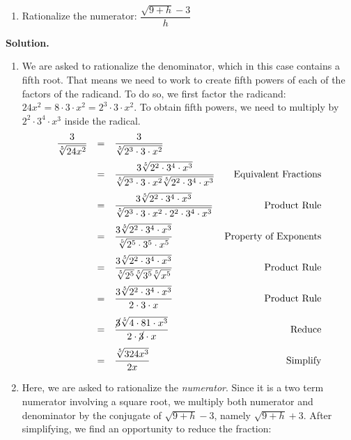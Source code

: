 \documentclass{ximera}
\begin{document}
{{{{\begin{example}
\begin{multicols}{2}
\begin{enumerate}
\item  Rationalize the numerator: $\dfrac{\sqrt{9 + h} - 3}{h}$

\setcounter{HW}{\value{enumi}}

\end{enumerate}
\end{multicols}

{\bf Solution.}

\begin{enumerate}

\item We are asked to rationalize the denominator, which in this case contains a fifth root.  That means we need to work to create fifth powers of each of the factors of the radicand.  To do so, we first factor the radicand:  $24x^2 = 8 \cdot 3 \cdot x^2 = 2^3 \cdot 3 \cdot x^2$.  To obtain fifth powers, we need to multiply by $2^2 \cdot 3^4 \cdot x^3$ inside the radical.  \[ \begin{array}{rclr}

\dfrac{3}{\sqrt[5]{24x^2}} & = & \dfrac{3}{\sqrt[5]{2^3 \cdot 3 \cdot x^2}} & \\ [12pt]
                           & = & \dfrac{3 \sqrt[5]{2^2 \cdot 3^4 \cdot x^3}}{\sqrt[5]{2^3 \cdot 3 \cdot x^2}\sqrt[5]{2^2 \cdot 3^4 \cdot x^3}} & \text{Equivalent Fractions} \\[12pt]
												& = & \dfrac{3 \sqrt[5]{2^2 \cdot 3^4 \cdot x^3}}{\sqrt[5]{2^3 \cdot 3 \cdot x^2 \cdot 2^2 \cdot 3^4 \cdot x^3}} & \text{Product Rule} \\[12pt]
													& = & \dfrac{3 \sqrt[5]{2^2 \cdot 3^4 \cdot x^3}}{\sqrt[5]{2^5 \cdot 3^5 \cdot x^5}} & \text{Property of Exponents}\\[12pt]
													
													& = & \dfrac{3 \sqrt[5]{2^2 \cdot 3^4 \cdot x^3}}{\sqrt[5]{2^5} \sqrt[5]{3^5}\sqrt[5]{x^5}} & \text{Product Rule}\\[12pt]
                          & = & \dfrac{3 \sqrt[5]{2^2 \cdot 3^4\cdot x^3}}{2 \cdot 3 \cdot x} & \text{Product Rule}\\[12pt]
													& = & \dfrac{\cancel{3} \sqrt[5]{4 \cdot 81\cdot x^3}}{2 \cdot \cancel{3} \cdot x} & \text{Reduce}\\[12pt]
													& = & \dfrac{\sqrt[5]{324x^3}}{2x} & \text{Simplify}\\
													\end{array}\]
													
\item  Here, we are asked to rationalize the \textit{numerator}.  Since it is a two term numerator involving a square root, we multiply both numerator and denominator by the conjugate of $\sqrt{9 + h} - 3$, namely $\sqrt{9 + h} + 3$.  After simplifying, we find an opportunity to reduce the fraction:\[\begin{array}{rclr}


\end{array}\]
\end{enumerate}
\end{example}}}}}
\end{document}
